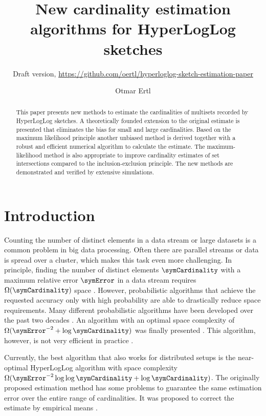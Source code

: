 \documentclass[a4paper]{scrartcl}
\title{New cardinality estimation algorithms for HyperLogLog sketches}
\subtitle{Draft version, \url{https://github.com/oertl/hyperloglog-sketch-estimation-paper}}
\author{Otmar Ertl}
\begin{document}
\maketitle
\begin{abstract}
This paper presents new methods to estimate the cardinalities of multisets recorded by HyperLogLog sketches. A theoretically founded extension to the original estimate is presented that eliminates the bias for small and large cardinalities. Based on the maximum likelihood principle another unbiased method is derived together with a robust and efficient numerical algorithm to calculate the estimate. The maximum-likelihood method is also appropriate to improve cardinality estimates of set intersections compared to the inclusion-exclusion principle. The new methods are demonstrated and verified by extensive simulations.
\end{abstract}

\section{Introduction}
Counting the number of distinct elements in a data stream or large datasets is a common problem in big data processing. Often there are parallel streams  or data is spread over a cluster, which makes this task even more challenging.
In principle, finding the number of distinct elements $\symCardinality$ with a maximum relative error $\symError$  in a data stream requires $\Omega(\symCardinality)$ space \cite{Alon1999}. However, probabilistic algorithms that achieve the requested accuracy only with high probability are able to drastically reduce space requirements. Many different probabilistic algorithms have been developed over the past two decades \cite{Metwally2008,Ting2014}. An algorithm with an optimal space complexity of $\Omega(\symError^{-2}+\log \symCardinality)$ \cite{Alon1999, Indyk2003} was finally presented \cite{Kane2010}. This algorithm, however, is not very efficient in practice \cite{Ting2014}.

Currently, the best algorithm that also works for distributed setups is the near-optimal HyperLogLog algorithm \cite{Flajolet2007} with space complexity $\Omega(\symError^{-2} \log\log\symCardinality +\log \symCardinality)$. The originally proposed estimation method has some problems to guarantee the same estimation error over the entire range of cardinalities. It was proposed to correct the estimate by empirical means \cite{Heule2013,Rhodes2015,Sanfilippo2014}. 
\end{document}
